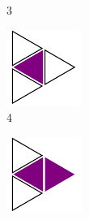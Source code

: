 \documentclass{article}
\begin{document}
\begin{figure}[H]
\begin{subfigure}[b]{0.1\textwidth}
         \caption*{3}
     \end{subfigure}
     \hfill
     \begin{subfigure}[b]{0.1\textwidth}
         \centering
         \includegraphics[width=\textwidth]{graphics/introduction/configurations/c4.pdf}
         \caption*{4}
     \end{subfigure}
     \hfill
     \begin{subfigure}[b]{0.1\textwidth}
         \centering
         \includegraphics[width=\textwidth]{graphics/introduction/configurations/c5.pdf}

\end{subfigure}
\end{figure}
\end{document}
